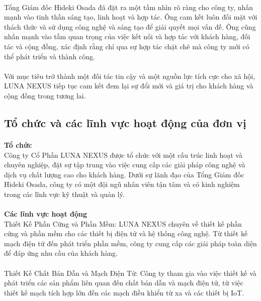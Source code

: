 \begin{flushleft}
		\paragraph{}
		\fontsize{16}{13}\selectfont Tổng Giám đốc Hideki Osada đã đặt ra một tầm nhìn rõ ràng cho công ty, nhấn mạnh vào tinh thần sáng tạo, linh hoạt và hợp tác. Ông cam kết luôn đối mặt với thách thức và sử dụng công nghệ và sáng tạo để giải quyết mọi vấn đề. Ông cũng nhấn mạnh vào tầm quan trọng của việc kết nối và hợp tác với khách hàng, đối tác và cộng đồng, xác định rằng chỉ qua sự hợp tác chặt chẽ mà công ty mới có thể phát triển và thành công.
		\paragraph{}
		\fontsize{16}{13}\selectfont Với mục tiêu trở thành một đối tác tin cậy và một nguồn lực tích cực cho xã hội, LUNA NEXUS tiếp tục cam kết đem lại sự đổi mới và giá trị cho khách hàng và cộng đồng trong tương lai.
		\subsection{Tổ chức và các lĩnh vực hoạt động của đơn vị}
		\paragraph{}
		\textbf{Tổ chức}\\
		\fontsize{16}{13}\selectfont Công ty Cổ Phần LUNA NEXUS được tổ chức với một cấu trúc linh hoạt và chuyên nghiệp, đặt sự tập trung vào việc cung cấp các giải pháp công nghệ và dịch vụ chất lượng cao cho khách hàng. Dưới sự lãnh đạo của Tổng Giám đốc Hideki Osada, công ty có một đội ngũ nhân viên tận tâm và có kinh nghiệm trong các lĩnh vực kỹ thuật và quản lý. \\
		\paragraph{}
		\textbf{Các lĩnh vực hoạt động}\\
		\fontsize{16}{13}\selectfont Thiết Kế Phần Cứng và Phần Mềm: LUNA NEXUS chuyên về thiết kế phần cứng và phần mềm cho các thiết bị điện tử và hệ thống công nghệ. Từ thiết kế mạch điện tử đến phát triển phần mềm, công ty cung cấp các giải pháp toàn diện để đáp ứng nhu cầu của khách hàng.\\
		\paragraph{}
		\fontsize{16}{13}\selectfont Thiết Kế Chất Bán Dẫn và Mạch Điện Tử: Công ty tham gia vào việc thiết kế và phát triển các sản phẩm liên quan đến chất bán dẫn và mạch điện tử, từ việc thiết kế mạch tích hợp lớn đến các mạch điều khiển từ xa và các thiết bị IoT.\\

\end{flushleft}

